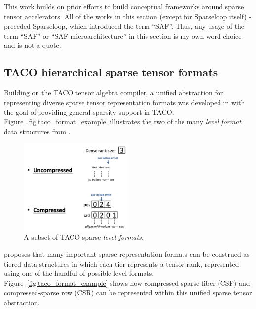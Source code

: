 This work builds on prior efforts to build conceptual frameworks around sparse tensor accelerators. All of the works in this section (except for Sparseloop\cite{sparseloop} itself) -  preceded Sparseloop, which introduced the term ``SAF''. Thus, any usage of the term ``SAF'' or ``SAF microarchitecture'' in this section is my own word choice and is not a quote.

\subsection{TACO\cite{taco}\cite{taco_format} hierarchical sparse tensor formats}
\label{sec:taco_format}

Building on the TACO tensor algebra compiler\cite{taco}, a unified abstraction for representing diverse sparse tensor representation formats was developed in \cite{taco_format} with the goal of providing general sparsity support in TACO\cite{taco}. Figure~\ref{fig:taco_format_example} illustrates the two of the many \textit{level format} data structures from \cite{taco_format}.

\begin{figure}[H]
\includegraphics[width=0.5\textwidth]{figures/taco_levels.png}
\caption{A subset\cite{taco_format} of TACO\cite{taco} sparse \textit{level formats.}}
\label{fig:taco_levels}
\end{figure}

\cite{taco_format} proposes that many important sparse representation formats can be construed as tiered data structures in which each tier represents a tensor rank, represented using one of the handful of possible level formats. Figure~\ref{fig:taco_format_example} shows how compressed-sparse fiber (CSF)\cite{csf} and compressed-sparse row (CSR) can be represented within this unified sparse tensor abstraction.

